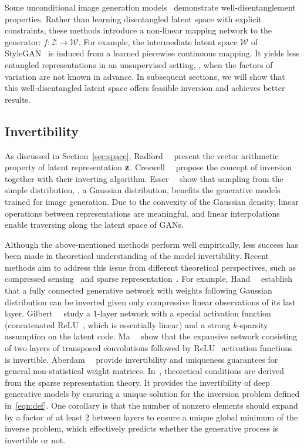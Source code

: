 Some unconditional image generation models~\cite{karras2019style,karras2020analyzing} demonstrate well-disentanglement properties. 
Rather than learning disentangled latent space with explicit constraints, these methods introduce a non-linear mapping network to the generator: $f:\mathcal{Z} \to \mathcal{W}$. 
For example, the intermediate latent space $\mathcal{W}$ of StyleGAN~\cite{karras2019style} is induced from a learned piecewise continuous mapping. It yields less entangled representations in an unsupervised setting, \ie, when the factors of variation are not known in advance.
In subsequent sections, we will show that this well-disentangled latent space offers feasible inversion and achieves better results.

\subsection{Invertibility}
\label{sec:invertibility}
As discussed in Section~\ref{sec:space}, Radford~\etal~\cite{radford2016dcgan} present the vector arithmetic property of latent representation $\mathbf{z}$.
Creswell~\etal~\cite{creswell2018inverting} propose the concept of inversion together with their inverting algorithm. 
Esser~\etal~\cite{esser2020invertible} show that sampling from the simple distribution, \eg, a Gaussian distribution, benefits the generative models trained for image generation. 
Due to the convexity of the Gaussian density, linear operations between representations are meaningful, and linear interpolations enable traversing along the latent space of GANs. 
 
Although the above-mentioned methods perform well empirically, less success has been made in theoretical understanding of the model invertibility. 
Recent methods aim to address this issue from different theoretical perspectives, such as compressed sensing~\cite{bora2017sensing, gilbert2017invert, ma2018invertibility} and sparse representation~\cite{aberdam2020invert}.
For example, Hand~\etal~\cite{hand2020global} establish that a fully connected generative network with weights following Gaussian distribution can be inverted given only compressive linear observations of its last layer.
Gilbert~\etal~\cite{gilbert2017invert} study a $1$-layer network with a special activation function (concatenated ReLU~\cite{shang2016understanding}, which is essentially linear) and a strong $k$-sparsity assumption on the latent code.
Ma~\etal~\cite{ma2018invertibility} show that the expansive network consisting of two layers of transposed convolutions followed by ReLU~\cite{nair2010rectified} activation functions is invertible.
Aberdam~\etal~\cite{aberdam2020invert} provide invertibility and uniqueness guarantees for general non-statistical weight matrices. 
In~\cite{aberdam2020invert}, theoretical conditions are derived from the sparse representation theory. 
It provides the invertibility of deep generative models by ensuring a unique solution for the inversion problem defined in~\eqref{eqn:def}. 
One corollary is that the number of nonzero elements should expand by a factor of at least $2$ between layers to ensure a unique global minimum of the inverse problem, which effectively predicts whether the generative process is invertible or not.

\tabfeature